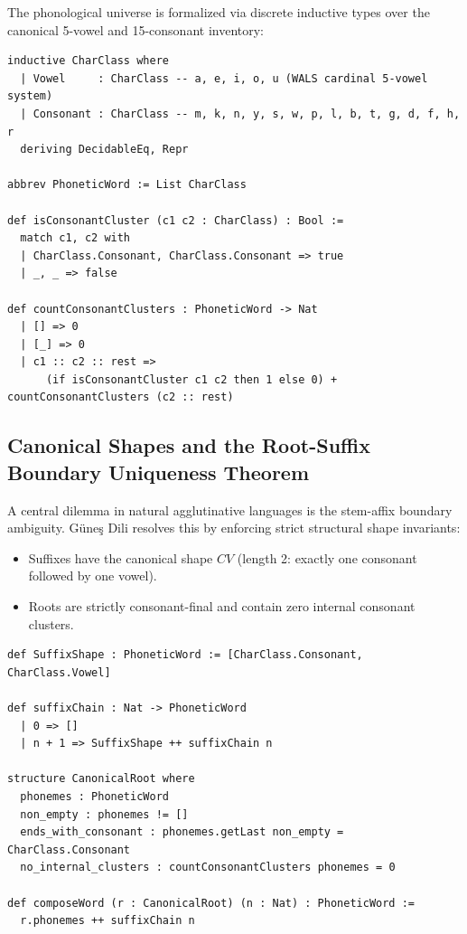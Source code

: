 \documentclass[11pt,a4paper]{article}
\begin{document}
The phonological universe is formalized via discrete inductive types over the canonical 5-vowel and 15-consonant inventory:
\begin{lstlisting}[language=Lean]
inductive CharClass where
  | Vowel     : CharClass -- a, e, i, o, u (WALS cardinal 5-vowel system)
  | Consonant : CharClass -- m, k, n, y, s, w, p, l, b, t, g, d, f, h, r
  deriving DecidableEq, Repr

abbrev PhoneticWord := List CharClass

def isConsonantCluster (c1 c2 : CharClass) : Bool :=
  match c1, c2 with
  | CharClass.Consonant, CharClass.Consonant => true
  | _, _ => false

def countConsonantClusters : PhoneticWord -> Nat
  | [] => 0
  | [_] => 0
  | c1 :: c2 :: rest =>
      (if isConsonantCluster c1 c2 then 1 else 0) + countConsonantClusters (c2 :: rest)
\end{lstlisting}

\subsection{Canonical Shapes and the Root-Suffix Boundary Uniqueness Theorem}

A central dilemma in natural agglutinative languages is the stem-affix boundary ambiguity. Güneş Dili resolves this by enforcing strict structural shape invariants:
\begin{itemize}
    \item Suffixes have the canonical shape $C V$ (length 2: exactly one consonant followed by one vowel).
    \item Roots are strictly consonant-final and contain zero internal consonant clusters.
\end{itemize}

\begin{lstlisting}[language=Lean]
def SuffixShape : PhoneticWord := [CharClass.Consonant, CharClass.Vowel]

def suffixChain : Nat -> PhoneticWord
  | 0 => []
  | n + 1 => SuffixShape ++ suffixChain n

structure CanonicalRoot where
  phonemes : PhoneticWord
  non_empty : phonemes != []
  ends_with_consonant : phonemes.getLast non_empty = CharClass.Consonant
  no_internal_clusters : countConsonantClusters phonemes = 0

def composeWord (r : CanonicalRoot) (n : Nat) : PhoneticWord :=
  r.phonemes ++ suffixChain n
\end{lstlisting}
\end{document}
